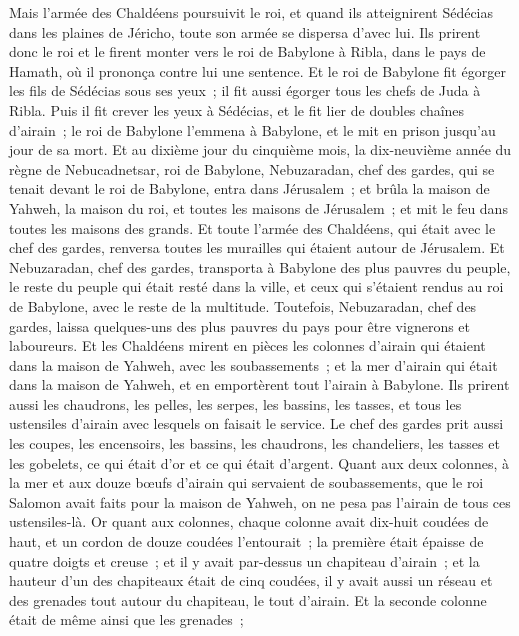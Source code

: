 \begin{multicols}{2}
Mais l'armée des Chaldéens poursuivit le roi, et quand ils atteignirent Sédécias dans les plaines de Jéricho, toute son armée se dispersa d'avec lui.
Ils prirent donc le roi et le firent monter vers le roi de Babylone à Ribla, dans le pays de Hamath, où il prononça contre lui une sentence.
Et le roi de Babylone fit égorger les fils de Sédécias sous ses yeux~; il fit aussi égorger tous les chefs de Juda à Ribla.
Puis il fit crever les yeux à Sédécias, et le fit lier de doubles chaînes d'airain~; le roi de Babylone l'emmena à Babylone, et le mit en prison jusqu'au jour de sa mort.
Et au dixième jour du cinquième mois, la dix-neuvième année du règne de Nebucadnetsar, roi de Babylone, Nebuzaradan, chef des gardes, qui se tenait devant le roi de Babylone, entra dans Jérusalem~;
et brûla la maison de Yahweh, la maison du roi, et toutes les maisons de Jérusalem~; et mit le feu dans toutes les maisons des grands.
Et toute l'armée des Chaldéens, qui était avec le chef des gardes, renversa toutes les murailles qui étaient autour de Jérusalem.
Et Nebuzaradan, chef des gardes, transporta à Babylone des plus pauvres du peuple, le reste du peuple qui était resté dans la ville, et ceux qui s'étaient rendus au roi de Babylone, avec le reste de la multitude.
Toutefois, Nebuzaradan, chef des gardes, laissa quelques-uns des plus pauvres du pays pour être vignerons et laboureurs.
Et les Chaldéens mirent en pièces les colonnes d'airain qui étaient dans la maison de Yahweh, avec les soubassements~; et la mer d'airain qui était dans la maison de Yahweh, et en emportèrent tout l'airain à Babylone.
Ils prirent aussi les chaudrons, les pelles, les serpes, les bassins, les tasses, et tous les ustensiles d'airain avec lesquels on faisait le service.
Le chef des gardes prit aussi les coupes, les encensoirs, les bassins, les chaudrons, les chandeliers, les tasses et les gobelets, ce qui était d'or et ce qui était d'argent.
Quant aux deux colonnes, à la mer et aux douze bœufs d'airain qui servaient de soubassements, que le roi Salomon avait faits pour la maison de Yahweh, on ne pesa pas l'airain de tous ces ustensiles-là.
Or quant aux colonnes, chaque colonne avait dix-huit coudées de haut, et un cordon de douze coudées l'entourait~; la première était épaisse de quatre doigts et creuse~;
et il y avait par-dessus un chapiteau d'airain~; et la hauteur d'un des chapiteaux était de cinq coudées, il y avait aussi un réseau et des grenades tout autour du chapiteau, le tout d'airain. Et la seconde colonne était de même ainsi que les grenades~;

\end{multicols}
